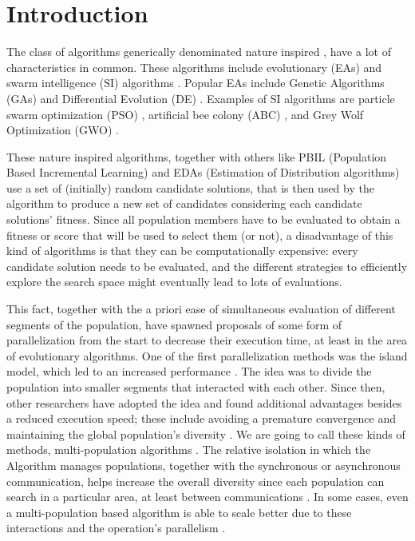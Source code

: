 \documentclass[runningheads]{llncs}
\begin{document}
\section{Introduction}


The class of algorithms generically denominated nature inspired
\cite{yang2014nature}, have a lot of characteristics in common.
These algorithms include evolutionary (EAs) and swarm
intelligence (SI) algorithms \cite{back1996evolutionary,kennedy2006swarm}. Popular
EAs include Genetic Algorithms (GAs) \cite{holland1992adaptation,eiben2003genetic}
and Differential Evolution (DE) \cite{karabouga2004simple}. Examples of SI algorithms
\cite{kennedy2006swarm} are particle swarm optimization (PSO) \cite{clerc2010particle},
artificial bee colony (ABC) \cite{karaboga2005idea}, and Grey Wolf Optimization (GWO)
\cite{mirjalili2014grey}.

These nature inspired algorithms, together with others like PBIL
(Population Based Incremental Learning) \cite{baluja1994population}
and EDAs (Estimation of Distribution algorithms)
\cite{larranaga2001estimation} use a set of (initially) random
candidate solutions, that is then used by the algorithm to produce a
new set of candidates considering each candidate solutions'
fitness. Since all population members have to be evaluated to obtain a
fitness or score that will be used to select them (or not), a
disadvantage of this kind of algorithms is that they can be
computationally expensive: every candidate solution needs to be
evaluated, and the different strategies to efficiently explore the
search space might eventually lead to lots of evaluations.

This fact, together with the a priori ease of simultaneous evaluation
of different segments of the population, have spawned proposals of
some form of parallelization from the start
\cite{muhlenbein1988evolution} to decrease their execution time, at
least in the area of evolutionary algorithms. One of the first
parallelization methods was the island model, which led to an
increased performance
\cite{gorges1990explicit,grosso1985computer}. The idea was to divide
the population into smaller segments that interacted with each
other. Since then, other researchers have adopted the idea and found
additional advantages besides a reduced execution speed; these include
avoiding a premature convergence and maintaining the global
population's diversity \cite{li2015multi}. We are going to call these
kinds of methods, multi-population algorithms \cite{Ma2019}. The
relative isolation in which the Algorithm manages populations,
together with the synchronous or asynchronous communication, helps
increase the overall diversity since each population can search in a
particular area, at least between communications
\cite{li2016multi,wu2016differential}. In some cases, even a
multi-population based algorithm is able to scale better due to these
interactions and the operation's parallelism \cite{ALBA20027}.
\end{document}
